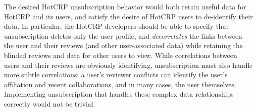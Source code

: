 The desired HotCRP unsubscription behavior would both retain useful data for HotCRP and its users,
and satisfy the desire of HotCRP users to de-identify their data. In particular, the HotCRP
developers should be able to specify that unsubscription deletes only the user profile, and
\emph{decorrelates} the links between the user and their reviews (and other user-associated data)
while retaining the blinded reviews and data for other users to view. While correlations between
users and their reviews are obviously identifying, unsubscription must also handle more subtle
correlations: a user's reviewer conflicts can identify the user's affiliation and recent
collaborations, and in many cases, the user themselves. Implementing unsubscription that handles
these complex data relationships correctly would not be trivial.


